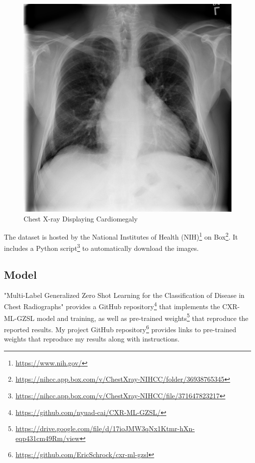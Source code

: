 \documentclass[letterpaper]{article} %
\begin{document}
\begin{figure}[h!]
\centering
\includegraphics[width=0.9\columnwidth]{cxr.png}
\caption{Chest X-ray Displaying Cardiomegaly}
\label{fig:cxr}
\end{figure}

The dataset is hosted by the National Institutes of Health (NIH)\footnote{\url{https://www.nih.gov/}} on Box\footnote{\url{https://nihcc.app.box.com/v/ChestXray-NIHCC/folder/36938765345}}. It includes a Python script\footnote{\url{https://nihcc.app.box.com/v/ChestXray-NIHCC/file/371647823217}} to automatically download the images.

\subsection{Model}
\label{sec:model}

"Multi-Label Generalized Zero Shot Learning for the Classification of Disease in Chest Radiographs" \cite{hayat2021multilabel} provides a GitHub repository\footnote{\url{https://github.com/nyuad-cai/CXR-ML-GZSL/}} that implements the CXR-ML-GZSL model and training, as well as pre-trained weights\footnote{\url{https://drive.google.com/file/d/17ioJMW3qNx1Ktmr-hXn-eqp431cm49Rm/view}} that reproduce the reported results. My project GitHub repository\footnote{\url{https://github.com/EricSchrock/cxr-ml-gzsl}} provides links to pre-trained weights that reproduce my results along with instructions.
\end{document}
